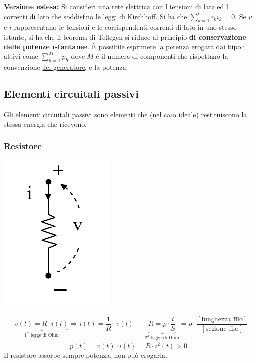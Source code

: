 \documentclass{article}
\begin{document}
\textbf{Versione estesa:}
Si consideri una rete elettrica con l tensioni di lato ed l correnti di lato che soddisfino le \underline{leggi di Kirchhoff}. Si ha che $\sum\limits_{k=1}^l r_k i_k = 0$. Se $v$ e $i$ rappresentano le tensioni e le corrispondenti correnti di lato in uno stesso istante, si ha che il teorema di Tellegen si riduce al principio \textbf{di conservazione delle potenze istantanee}. È possibile esprimere la potenza \underline{erogata} dai bipoli attivi come $\sum\limits_{h=1}^M p_h$ dove $M$ è il numero di componenti che rispettano la convenzione \underline{del generatore}, e la potenza









\subsection{Elementi circuitali passivi}
Gli elementi circuitali passivi sono elementi che (nel caso ideale) restituiscono la stessa energia che ricevono. 
\subsubsection{Resistore}
\begin{center}
    \includegraphics[scale=0.4]{Image/Resistore.png}
\end{center}
\begin{align*}
    &\underbrace{v(t) = R \cdot i(t)}_{1^a\text{ legge di Ohm}} \Longrightarrow i(t) = \dfrac{1}{R} \cdot v(t) & &\underbrace{R = \rho \cdot \dfrac{l}{S}}_{2^a \text{ legge di Ohm}} = \rho \cdot  \dfrac{[\text{lunghezza filo}]}{[\text{sezione filo}]}
\end{align*}
\[
    p(t) = v(t) \cdot i(t) = R \cdot i^2(t) >0
\]
Il resistore assorbe sempre potenza, non può erogarla.
\end{document}
